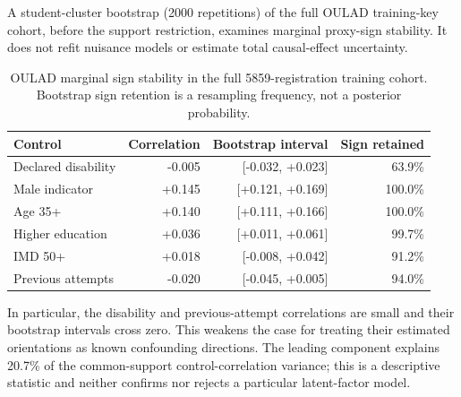 A student-cluster bootstrap (2000 repetitions) of the full OULAD training-key cohort, before the support restriction, examines marginal proxy-sign stability. 
It does not refit nuisance models or estimate total causal-effect uncertainty.
\begin{table}[htbp]\centering\small
\caption{OULAD marginal sign stability in the full 5859-registration training cohort. Bootstrap sign retention is a resampling frequency, not a posterior probability.}\label{tab:orientation}
\begin{tabularx}{\textwidth}{Xrrr}\toprule Control & Correlation & Bootstrap interval & Sign retained \\\midrule
Declared disability & -0.005 & [-0.032, +0.023] & 63.9\% \\
Male indicator & +0.145 & [+0.121, +0.169] & 100.0\% \\
Age 35+ & +0.140 & [+0.111, +0.166] & 100.0\% \\
Higher education & +0.036 & [+0.011, +0.061] & 99.7\% \\
IMD 50+ & +0.018 & [-0.008, +0.042] & 91.2\% \\
Previous attempts & -0.020 & [-0.045, +0.005] & 94.0\% \\
\bottomrule\end{tabularx}\end{table}
In particular, the disability and previous-attempt correlations are small and their bootstrap intervals cross zero. This weakens the case for treating their estimated orientations as known confounding directions. The leading component explains 20.7\% of the common-support control-correlation variance; this is a descriptive statistic and neither confirms nor rejects a particular latent-factor model.
